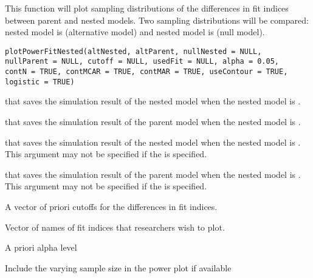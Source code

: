 \documentclass[a4paper]{book}
\begin{document}
%
\begin{Description}\relax
This function will plot sampling distributions of the differences in fit indices between parent and nested models. Two sampling distributions will be compared: nested model is  (alternative model) and nested model is  (null model). 
\end{Description}
%
\begin{Usage}
\begin{verbatim}
plotPowerFitNested(altNested, altParent, nullNested = NULL, 
nullParent = NULL, cutoff = NULL, usedFit = NULL, alpha = 0.05, 
contN = TRUE, contMCAR = TRUE, contMAR = TRUE, useContour = TRUE, 
logistic = TRUE)
\end{verbatim}
\end{Usage}
%
\begin{Arguments}
\begin{ldescription}
\item[\code{altNested}] 
 that saves the simulation result of the nested model when the nested model is .

\item[\code{altParent}] 
 that saves the simulation result of the parent model when the nested model is .

\item[\code{nullNested}] 
 that saves the simulation result of the nested model when the nested model is . This argument may not be specified if the  is specified.

\item[\code{nullParent}] 
 that saves the simulation result of the parent model when the nested model is . This argument may not be specified if the  is specified.

\item[\code{cutoff}] 
A vector of priori cutoffs for the differences in fit indices.

\item[\code{usedFit}] 
Vector of names of fit indices that researchers wish to plot.

\item[\code{alpha}] 
A priori alpha level

\item[\code{contN}] 
Include the varying sample size in the power plot if available


\end{ldescription}
\end{Arguments}
\end{document}

